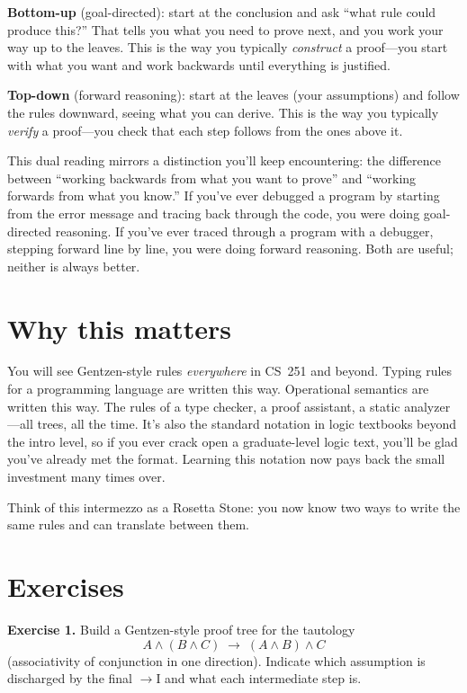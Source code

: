 \documentclass[11pt]{article}
\begin{document}
\textbf{Bottom-up} (goal-directed): start at the conclusion and ask ``what rule could produce this?'' That tells you what you need to prove next, and you work your way up to the leaves. This is the way you typically \emph{construct} a proof---you start with what you want and work backwards until everything is justified.

\textbf{Top-down} (forward reasoning): start at the leaves (your assumptions) and follow the rules downward, seeing what you can derive. This is the way you typically \emph{verify} a proof---you check that each step follows from the ones above it.

This dual reading mirrors a distinction you'll keep encountering: the difference between ``working backwards from what you want to prove'' and ``working forwards from what you know.'' If you've ever debugged a program by starting from the error message and tracing back through the code, you were doing goal-directed reasoning. If you've ever traced through a program with a debugger, stepping forward line by line, you were doing forward reasoning. Both are useful; neither is always better.

\section{Why this matters}

You will see Gentzen-style rules \emph{everywhere} in CS~251 and beyond. Typing rules for a programming language are written this way. Operational semantics are written this way. The rules of a type checker, a proof assistant, a static analyzer---all trees, all the time. It's also the standard notation in logic textbooks beyond the intro level, so if you ever crack open a graduate-level logic text, you'll be glad you've already met the format. Learning this notation now pays back the small investment many times over.

Think of this intermezzo as a Rosetta Stone: you now know two ways to write the same rules and can translate between them.

\section{Exercises}

\bigskip
\textbf{Exercise 1.}\label{ex:gentzen:1} Build a Gentzen-style proof tree for the tautology
\[
  A \wedge (B \wedge C) \;\to\; (A \wedge B) \wedge C
\]
(associativity of conjunction in one direction). Indicate which assumption is discharged by the final $\to$I and what each intermediate step is.
\end{document}
